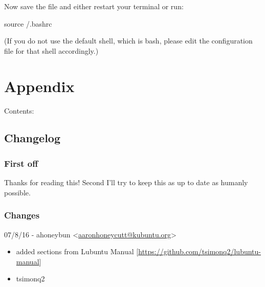 \documentclass[letterpaper,10pt,english]{sphinxmanual}
\begin{document}
\begin{sphinxVerbatim}[commandchars=\\\{\}]
 
 
\end{sphinxVerbatim}

Now save the file and either restart your terminal or run:

\begin{sphinxVerbatim}[commandchars=\\\{\}]
\PYGZdl{} source \PYGZti{}/.bashrc
\end{sphinxVerbatim}

(If you do not use the default shell, which is bash, please edit the configuration file for that shell accordingly.)


\chapter{Appendix}
\label{\detokenize{docs/appendix/appendix:appendix}}\label{\detokenize{docs/appendix/appendix::doc}}
Contents:


\section{Changelog}
\label{\detokenize{docs/appendix/changes::doc}}\label{\detokenize{docs/appendix/changes:changelog}}

\subsection{First off}
\label{\detokenize{docs/appendix/changes:first-off}}
Thanks for reading this! Second I'll try to keep this as up to date as humanly possible.


\subsection{Changes}
\label{\detokenize{docs/appendix/changes:changes}}
07/8/16 - ahoneybun \textless{}\href{mailto:aaronhoneycutt@kubuntu.org}{aaronhoneycutt@kubuntu.org}\textgreater{}
\begin{itemize}
\item {} 
added sections from Lubuntu Manual {[}\url{https://github.com/tsimonq2/lubuntu-manual}{]}

\end{itemize}
\begin{itemize}
\item {} 
tsimonq2

\end{itemize}
\end{document}
